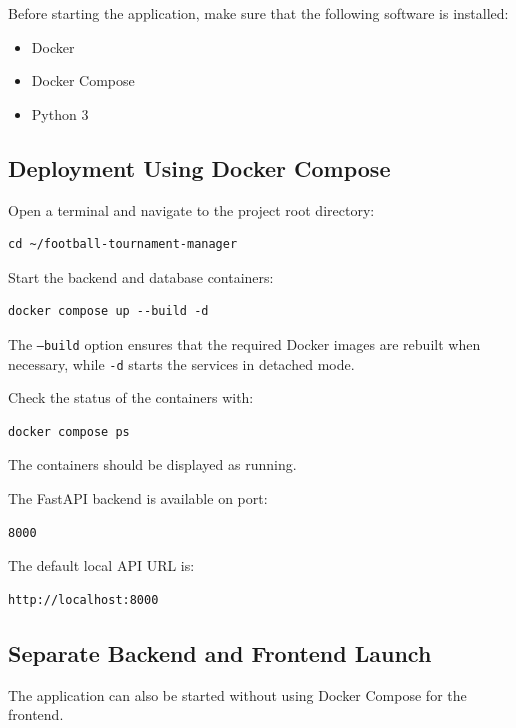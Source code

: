 \documentclass[12pt,a4paper]{article}
\begin{document}
Before starting the application, make sure that the following
software is installed:

\begin{itemize}
\item Docker
\item Docker Compose
\item Python 3
\end{itemize}

\subsection{Deployment Using Docker Compose}

Open a terminal and navigate to the project root directory:

\begin{lstlisting}
cd ~/football-tournament-manager
\end{lstlisting}

Start the backend and database containers:

\begin{lstlisting}
docker compose up --build -d
\end{lstlisting}

The \texttt{--build} option ensures that the required Docker
images are rebuilt when necessary, while \texttt{-d} starts
the services in detached mode.

Check the status of the containers with:

\begin{lstlisting}
docker compose ps
\end{lstlisting}

The containers should be displayed as running.

The FastAPI backend is available on port:

\begin{lstlisting}
8000
\end{lstlisting}

The default local API URL is:

\begin{lstlisting}
http://localhost:8000
\end{lstlisting}

\subsection{Separate Backend and Frontend Launch}

The application can also be started without using Docker
Compose for the frontend.
\end{document}
